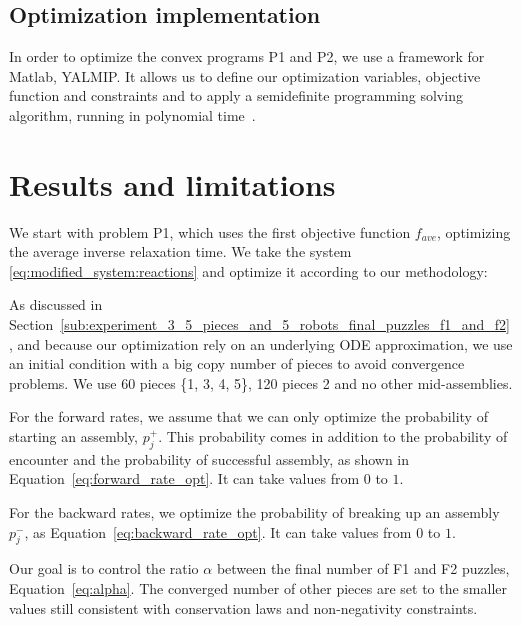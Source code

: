 		
	
	\subsection{Optimization implementation} %
	\label{sub:optimization_implementation}
		In order to optimize the convex programs P1 and P2, we use a framework for Matlab, YALMIP\cite{Lofberg:2004p11461}. It allows us to define our optimization variables, objective function and constraints and to apply a semidefinite programming solving algorithm, running in polynomial time~\cite{Lofberg:2004p11461}.



\section{Results and limitations} %
\label{sec:results_and_limitations}
		
	We start with problem P1, which uses the first objective function $f_{ave}$, optimizing the average inverse relaxation time. We take the system \eqref{eq:modified_system:reactions} and optimize it according to our methodology:
	
	\begin{my_itemize}
		\item As discussed in Section~\ref{sub:experiment_3_5_pieces_and_5_robots_final_puzzles_f1_and_f2}, and because our optimization rely on an underlying ODE approximation, we use an initial condition with a big copy number of pieces to avoid convergence problems. We use 60 pieces \{1, 3, 4, 5\}, 120 pieces 2 and no other mid-assemblies.
		\item For the forward rates, we assume that we can only optimize the probability of starting an assembly, $p_j^+$. This probability comes in addition to the probability of encounter and the probability of successful assembly, as shown in Equation~\eqref{eq:forward_rate_opt}. It can take values from $0$ to $1$.
		\item For the backward rates, we optimize the probability of breaking up an assembly $p_j^-$, as Equation~\eqref{eq:backward_rate_opt}. It can take values from $0$ to $1$.
		\item Our goal is to control the ratio $\alpha$ between the final number of F1 and F2 puzzles, Equation~\eqref{eq:alpha}. The converged number of other pieces are set to the smaller values still consistent with conservation laws and non-negativity constraints.
	\end{my_itemize}
	
